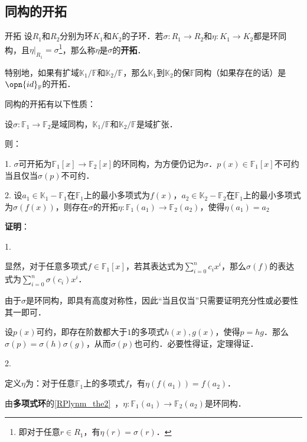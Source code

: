 \subsection{同构的开拓}

\begin{definition}{开拓}
设$R_1$和$R_2$分别为环$K_1$和$K_2$的子环．若$\sigma:R_1\to R_2$和$\eta:K_1\to K_2$都是环同构，且$\eta|_{R_1}=\sigma$\footnote{即对于任意$r\in R_1$，有$\eta(r)=\sigma(r)$．}，那么称$\eta$是$\sigma$的\textbf{开拓}．
\end{definition}

特别地，如果有扩域$\mathbb{K}_1/\mathbb{F}$和$\mathbb{K}_2/\mathbb{F}$，那么$\mathbb{K}_1$到$\mathbb{K}_2$的保$\mathbb{F}$同构（如果存在的话）是$\opn{id}_\mathbb{F}$的开拓．

同构的开拓有以下性质：

\begin{theorem}{}\label{FldExp_the4}
设$\sigma:\mathbb{F}_1\to\mathbb{F}_2$是域同构，$\mathbb{K}_1/\mathbb{F}$和$\mathbb{K}_2/\mathbb{F}$是域扩张．

则：

1. $\sigma$可开拓为$\mathbb{F}_1[x]\to\mathbb{F}_2[x]$的环同构，为方便仍记为$\sigma$．$p(x)\in\mathbb{F}_1[x]$不可约当且仅当$\sigma(p)$不可约．

2. 设$a_1\in\mathbb{K}_1-\mathbb{F}_1$在$\mathbb{F}_1$上的最小多项式为$f(x)$，$a_2\in\mathbb{K}_2-\mathbb{F}_2$在$\mathbb{F}_1$上的最小多项式为$\sigma(f(x))$，则存在$\sigma$的开拓$\eta:\mathbb{F}_1(a_1)\to \mathbb{F}_2(a_2)$，使得$\eta(a_1)=a_2$
\end{theorem}

\textbf{证明}：

1. 

显然，对于任意多项式$f\in\mathbb{F}_1[x]$，若其表达式为$\sum_{i=0}^n c_ix^i$，那么$\sigma(f)$的表达式为$\sum_{i=0}^n \sigma(c_i)x^i$．

由于$\sigma$是环同构，即具有高度对称性，因此“当且仅当”只需要证明充分性或必要性其一即可．

设$p(x)$可约，即存在阶数都大于$1$的多项式$h(x),g(x)$，使得$p=hg$．那么$\sigma(p)=\sigma(h)\sigma(g)$，从而$\sigma(p)$也可约．必要性得证，定理得证．

2. 

定义$\eta$为：对于任意$\mathbb{F}_1$上的多项式$f$，有$\eta(f(a_1))=f(a_2)$．

由\textbf{多项式环}的\autoref{RPlynm_the2}~，$\eta:\mathbb{F}_1(a_1)\to \mathbb{F}_2(a_2)$是环同构．



